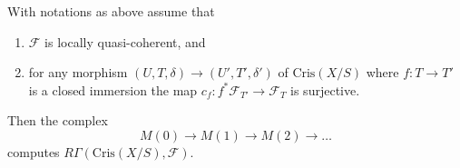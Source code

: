 \begin{proposition}
\label{proposition-compute-cohomology}
With notations as above assume that
\begin{enumerate}
\item $\mathcal{F}$ is locally quasi-coherent, and
\item for any morphism $(U, T, \delta) \to (U', T', \delta')$
of $\text{Cris}(X/S)$ where $f : T \to T'$ is a closed immersion
the map $c_f : f^*\mathcal{F}_{T'} \to \mathcal{F}_T$ is surjective.
\end{enumerate}
Then the complex
$$
M(0) \to M(1) \to M(2) \to \ldots
$$
computes $R\Gamma(\text{Cris}(X/S), \mathcal{F})$.
\end{proposition}
